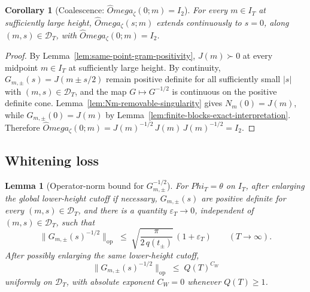 \documentclass[11pt,a4paper]{amsart}
\def\Omega{Omega}%
\def\Phi{Phi}%
\numberwithin{equation}{section}
\theoremstyle{plain}
\newtheorem{lemma}[theorem]{Lemma}
\newtheorem{corollary}[theorem]{Corollary}
\theoremstyle{definition}
\newcommand{\z}{\zeta}
\newcommand{\Om}{\Omega}
\newcommand{\Ph}{\Phi}
\newcommand{\op}{\mathrm{op}}
\begin{document}
\begin{corollary}[Coalescence: \(\widehat\Om_\z(0;m) = I_2\)]
\label{cor:omega-coalescence}
For every \(m\in I_T\) at sufficiently large height,
\(\widehat\Om_\z(s;m)\) extends continuously to \(s=0\), along
\((m,s)\in\mathcal D_T\), with \(\widehat\Om_\z(0;m) = I_2\).
\end{corollary}

\begin{proof}
By Lemma~\ref{lem:same-point-gram-positivity}, \(J(m)\succ 0\) at
every midpoint \(m\in I_T\) at sufficiently large height.  By continuity,
\(G_{m,\pm}(s) = J(m\pm s/2)\) remain positive definite for all
sufficiently small \(|s|\) with \((m,s)\in\mathcal D_T\), and the map
\(G\mapsto G^{-1/2}\) is continuous on the positive definite cone.
Lemma~\ref{lem:Nm-removable-singularity} gives \(N_m(0) = J(m)\),
while \(G_{m,\pm}(0) = J(m)\) by
Lemma~\ref{lem:finite-blocks-exact-interpretation}.  Therefore
\(\widehat\Om_\z(0;m) = J(m)^{-1/2}\,J(m)\,J(m)^{-1/2} = I_2\).
\end{proof}

\subsection{Whitening loss}
\label{subsec:whitening-loss}

\begin{lemma}[Operator-norm bound for \(G_{m,\pm}^{-1/2}\)]
\label{lem:whitening-loss}
For \(\Ph_T = \theta\) on \(I_T\), after enlarging the global
lower-height cutoff if necessary, \(G_{m,\pm}(s)\) are positive
definite for every \((m,s)\in\mathcal D_T\), and there is a quantity
\(\varepsilon_T\to 0\), independent of \((m,s)\in\mathcal D_T\), such
that
\begin{equation}
\label{eq:whitening-loss-bound}
        \bigl\|G_{m,\pm}(s)^{-1/2}\bigr\|_{\op}
        \;\le\;
        \sqrt{\frac{\pi}{2\,q(t_\pm)}}\,(1+\varepsilon_T)
        \qquad (T\to\infty).
\end{equation}
After possibly enlarging the same lower-height cutoff,
\begin{equation}
\label{eq:whitening-loss-polynomial}
        \bigl\|G_{m,\pm}(s)^{-1/2}\bigr\|_{\op}
        \;\le\; Q(T)^{C_W}
\end{equation}
uniformly on \(\mathcal D_T\), with absolute exponent \(C_W = 0\)
whenever \(Q(T)\ge 1\).
\end{lemma}
\end{document}
